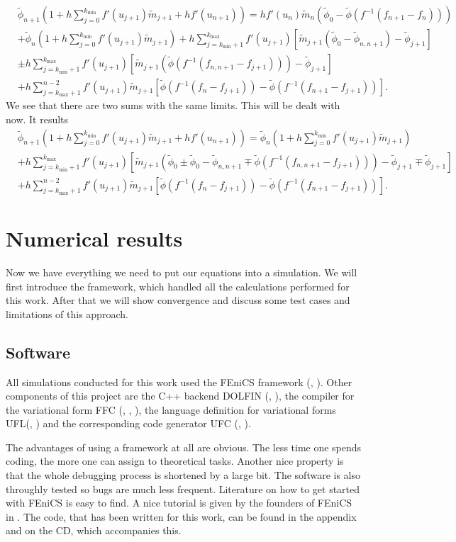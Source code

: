 \documentclass[12pt,a4paper,twoside, open=right]{scrreprt}
\theoremstyle{definition}
\theoremstyle{plain}
\newcommand{\tpne}{\tilde\phi_{n+1}}
\newcommand{\tpn}{\tilde\phi_{n}}
\begin{document}
\begin{align}
    &\tpne\left(1+h\sum_{j=0}^{k_{\min}}f'(u_{j+1})\tilde{m}_{j+1}+hf'(u_{n+1})\right)=hf'(u_n)\tilde{m}_n(\tilde\phi_0-\tilde\phi(f^{-1}(f_{n+1}-f_n)))\\
    &+\tpn\left(1+h\sum_{j=0}^{k_{\min}}f'(u_{j+1})\tilde{m}_{j+1}\right)+h\sum_{j=k_{\min}+1}^{k_{\max}}f'(u_{j+1})[\tilde{m}_{j+1}(\tilde\phi_0-\tilde\phi_{n,n+1})-\tilde\phi_{j+1}]\\
    &\pm h\sum_{j=k_{\min} +1}^{k_{\max}}f'(u_{j+1})[\tilde{m}_{j+1}(\tilde\phi(f^{-1}(f_{n,n+1}-f_{j+1})))-\tilde\phi_{j+1}]\\
    &+h\sum_{j=k_{\max}+1}^{n-2}f'(u_{j+1})\tilde{m}_{j+1}[\tilde\phi(f^{-1}(f_n-f_{j+1}))-\tilde\phi(f^{-1}(f_{n+1}-f_{j+1}))].
\end{align}
We see that there are two sums with the same limits. This will be dealt with now. It results
\begin{align}
    &\tpne\left(1+h\sum_{j=0}^{k_{\min}}f'(u_{j+1})\tilde{m}_{j+1}+hf'(u_{n+1})\right)=\tpn\left(1+h\sum_{j=0}^{k_{\min}}f'(u_{j+1})\tilde{m}_{j+1}\right)\\
    &+h\sum_{j=k_{\min} +1}^{k_{\max}}f'(u_{j+1})[\tilde{m}_{j+1}(\tilde\phi_0\pm\tilde\phi_0-\tilde\phi_{n,n+1}\mp\tilde\phi(f^{-1}(f_{n,n+1}-f_{j+1})))-\tilde\phi_{j+1}\mp\tilde\phi_{j+1}]\\
    &+h\sum_{j=k_{\max}+1}^{n-2}f'(u_{j+1})\tilde{m}_{j+1}[\tilde\phi(f^{-1}(f_n-f_{j+1}))-\tilde\phi(f^{-1}(f_{n+1}-f_{j+1}))].
\end{align}
\chapter{Numerical results}
Now we have everything we need to put our equations into a simulation. We will first introduce the framework, which handled all the calculations performed for this work. After that we will show convergence and discuss some test cases and limitations of this approach.
\section{Software}
All simulations conducted for this work used the FEniCS framework (\cite{AlnaesBlechta2015a}, \cite{LoggMardalEtAl2012a}). Other components of this project are the C++ backend DOLFIN (\cite{LoggWells2010a}, \cite{LoggWellsEtAl2012a}), the compiler for the variational form FFC (\cite{KirbyLogg2006a}, \cite{LoggOlgaardEtAl2012a}, \cite{OlgaardWells2010b}), the language definition for variational forms UFL(\cite{AlnaesEtAl2012}, \cite{Alnaes2012a}) and the corresponding code generator UFC (\cite{AlnaesLoggEtAl2009a}, \cite{AlnaesLoggEtAl2012a}).
\par 
The advantages of using a framework at all are obvious. The less time one spends coding, the more one can assign to theoretical tasks. Another nice property is that the whole debugging process is shortened by a large bit. The software is also throughly tested so bugs are much less frequent. Literature on how to get started with FEniCS is easy to find. A nice tutorial is given by the founders of FEniCS in  \cite{Langtangen2017a}. The code, that has been written for this work, can be found in the appendix and on the CD, which accompanies this.
\end{document}

